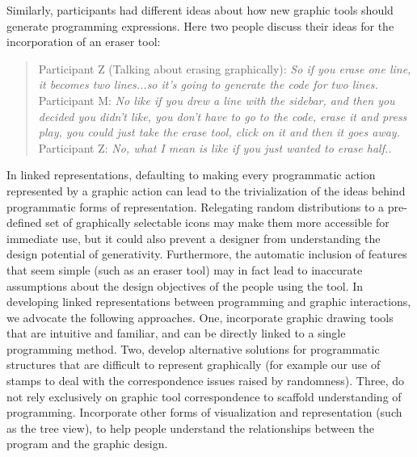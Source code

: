 \documentclass{sigchi}
\begin{document}
Similarly, participants had different ideas about how new graphic tools should generate programming expressions. Here two people discuss their ideas for the incorporation of an eraser tool:
\begin{quote}
Participant Z (Talking about erasing graphically): \textit{So if you erase one line, it becomes two lines...so it's going to generate the code for two lines.}
Participant M: \textit{No like if you drew a line with the sidebar, and then you decided you didn't like, you don't have to go to the code, erase it and press play, you could just take the erase tool, click on it and then it goes away.}
Participant Z: \textit{No, what I mean is like if you just wanted to erase half..}
\end{quote}

In linked representations, defaulting to making every programmatic action represented by a graphic action can lead to the trivialization of the ideas behind programmatic forms of representation. Relegating random distributions to a pre-defined set of graphically selectable icons may make them more accessible for immediate use, but it could also prevent a designer from understanding the design potential of generativity. Furthermore, the automatic inclusion of features that seem simple (such as an eraser tool) may in fact lead to inaccurate assumptions about the design objectives of the people using the tool. In developing linked representations between programming and graphic interactions, we advocate the following approaches. One, incorporate graphic drawing tools that are intuitive and familiar, and can be directly linked to a single programming method. Two, develop alternative solutions for programmatic structures that are difficult to represent graphically (for example our use of stamps to deal with the correspondence issues raised by randomness). Three, do not rely exclusively on graphic tool correspondence to scaffold understanding of programming. Incorporate other forms of visualization and representation (such as the tree view), to help people understand the relationships between the program and the graphic design.
\end{document}
